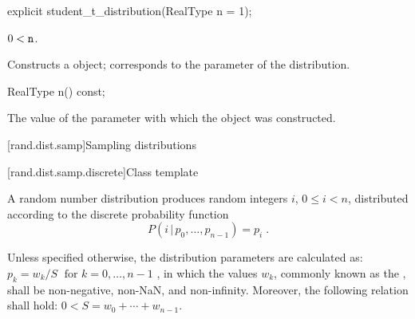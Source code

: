 %
\begin{itemdecl}
explicit student_t_distribution(RealType n = 1);
\end{itemdecl}

\begin{itemdescr}
\pnum\requires
 $ 0 < \texttt{n} $.

\pnum\effects Constructs a  object;
  corresponds to the parameter of the distribution.
\end{itemdescr}

%
\begin{itemdecl}
RealType n() const;
\end{itemdecl}

\begin{itemdescr}
\pnum\returns The value of the  parameter
 with which the object was constructed.
\end{itemdescr}%
%



[rand.dist.samp]{Sampling distributions}%
%



[rand.dist.samp.discrete]{Class template }%
%
%

\pnum
A  random number distribution
produces random integers $i$, $0 \leq i < n$,
distributed according to
the discrete probability function%
%
%
\[%
 P(i\,|\,p_0,\ldots,p_{n-1})
      = p_i
\; \mbox{.}
\]

\pnum
Unless specified otherwise,
the distribution parameters are calculated as:
 $p_k = {w_k / S} \; \mbox{  for } k = 0, \ldots, n\!-\!1$ ,
in which
the values $w_k$,
commonly known as the %
%
%
, shall be non-negative, non-NaN, and non-infinity.
Moreover, the following relation shall hold:
 $ 0 < S = w_0 + \cdots + w_{n-1} $.

